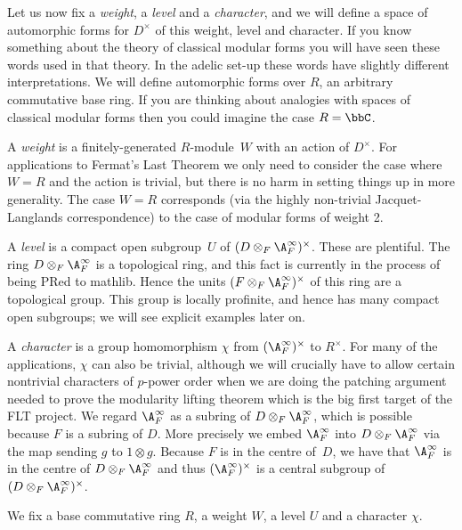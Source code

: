 Let us now fix a \emph{weight}, a \emph{level} and a \emph{character}, and we will define
a space of automorphic forms for $D^\times$ of this weight, level and character. If you know
something about the theory of classical modular forms you will have seen these words used in that
theory. In the adelic set-up these words have slightly different interpretations. We will define
automorphic forms over $R$, an arbitrary commutative base ring. If you are thinking about analogies
with spaces of classical modular forms then you could imagine the case $R=\bbC$.

A \emph{weight} is a finitely-generated $R$-module~$W$ with an action of $D^\times$. For applications
to Fermat's Last Theorem we only need to consider the case where $W=R$ and the action is trivial,
but there is no harm in setting things up in more generality. The case $W=R$ corresponds (via
the highly non-trivial Jacquet-Langlands correspondence) to the case of modular forms of weight 2.

A \emph{level} is a compact open subgroup~$U$ of $(D\otimes_F\A_F^\infty)^\times$. These are plentiful.
The ring $D\otimes_F\A_F^\infty$ is a topological ring, and this fact is currently in the process
of being PRed to mathlib. Hence the units $(F\otimes_F\A_F^\infty)^\times$ of this ring are a topological
group. This group is locally profinite, and hence has many compact open subgroups; we will see
explicit examples later on.

A \emph{character} is a group homomorphism $\chi$ from $(\A_F^\infty)^\times$ to $R^\times$. For many
of the applications, $\chi$ can also be trivial, although we will crucially have to allow
certain nontrivial characters of $p$-power order when we are doing the patching argument needed
to prove the modularity lifting theorem which is the big first target of the FLT project.
We regard $\A_F^\infty$ as a subring of $D\otimes_F\A_F^\infty$, which is possible because
$F$ is a subring of $D$. More precisely we embed $\A_F^\infty$ into $D\otimes_F\A_F^\infty$
via the map sending $g$ to $1\otimes g$. Because $F$ is in the centre of~$D$, we have
that $\A_F^\infty$ is in the centre of $D\otimes_F\A_F^\infty$ and thus $(\A_F^\infty)^\times$
is a central subgroup of $(D\otimes_F\A_F^\infty)^\times$.

We fix a base commutative ring $R$, a weight $W$, a level $U$ and a character $\chi$.

